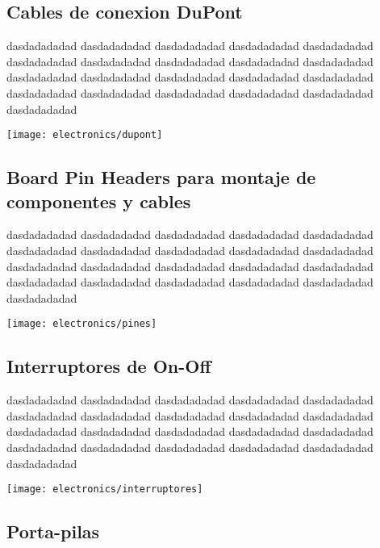 \subsection{Cables de conexion DuPont}
dasdadadadad dasdadadadad dasdadadadad dasdadadadad dasdadadadad dasdadadadad dasdadadadad dasdadadadad dasdadadadad dasdadadadad dasdadadadad dasdadadadad dasdadadadad dasdadadadad dasdadadadad dasdadadadad dasdadadadad dasdadadadad dasdadadadad dasdadadadad dasdadadadad 

\begin{center}
    \centering
    \texttt{[image: electronics/dupont]}
    \label{fig:dupont}
\end{center}

\subsection{Board Pin Headers para montaje de componentes y cables}
dasdadadadad dasdadadadad dasdadadadad dasdadadadad dasdadadadad dasdadadadad dasdadadadad dasdadadadad dasdadadadad dasdadadadad dasdadadadad dasdadadadad dasdadadadad dasdadadadad dasdadadadad dasdadadadad dasdadadadad dasdadadadad dasdadadadad dasdadadadad dasdadadadad 

\begin{center}
    \centering
    \texttt{[image: electronics/pines]}
    \label{fig:pines}
\end{center}

\subsection{Interruptores de On-Off}
dasdadadadad dasdadadadad dasdadadadad dasdadadadad dasdadadadad dasdadadadad dasdadadadad dasdadadadad dasdadadadad dasdadadadad dasdadadadad dasdadadadad dasdadadadad dasdadadadad dasdadadadad dasdadadadad dasdadadadad dasdadadadad dasdadadadad dasdadadadad dasdadadadad 

\begin{center}
    \centering
    \texttt{[image: electronics/interruptores]}
    \label{fig:interruptores}
\end{center}

\subsection{Porta-pilas}

